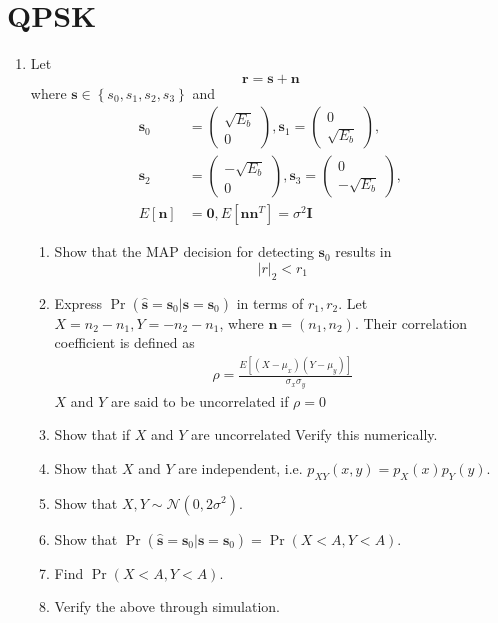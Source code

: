 \documentclass[journal,10pt,twocolumn]{IEEEtran}
\providecommand{\pr}[1]{\ensuremath{\Pr\left(#1\right)}}
\providecommand{\sbrak}[1]{\ensuremath{{}\left[#1\right]}}
\providecommand{\brak}[1]{\ensuremath{\left(#1\right)}}
\providecommand{\cbrak}[1]{\ensuremath{\left\{#1\right\}}}
\providecommand{\abs}[1]{\left\vert#1\right\vert}
\newcommand{\myvec}[1]{\ensuremath{\begin{pmatrix}#1\end{pmatrix}}}
\begin{document}
%
\section{QPSK}
\begin{enumerate}
\item
Let
\begin{equation}
\mathbf{r} = \mathbf{s}+ \mathbf{n}
\end{equation}
where $\mathbf{s} \in \cbrak{s_0,s_1,s_2, s_3}$ and
\begin{align}
\mathbf{s}_0 &= 
\myvec{
\sqrt{E_b}\\
0
},
\mathbf{s}_1 = 
\myvec{
0\\
\sqrt{E_b}
},
\\
\mathbf{s}_2 &= 
\myvec{
-\sqrt{E_b}\\
0
},
\mathbf{s}_3 = 
\myvec{
0\\
-\sqrt{E_b}
},
\\
E\sbrak{\mathbf{n}} &= \mathbf{0}, E\sbrak{\mathbf{n}\mathbf{n}^T} = \sigma^2 \mathbf{I}
\end{align}
%
\begin{enumerate}[label=(\alph{enumii})]
\item Show that the MAP decision for detecting $\mathbf{s}_0$ results in
\begin{equation}
\abs{r}_2 < r_1
\end{equation}
\item Express $\pr{\hat{\mathbf{s}} = \mathbf{s}_0|\mathbf{s} = \mathbf{s}_0}$ in terms of $r_1, r_2$.
Let $X=n_2-n_1, Y = -n_2-n_1$, where $\mathbf{n}=\brak{n_1,n_2}$.
Their correlation coefficient is defined as
%
\begin{align}
\rho = \frac{E\sbrak{\brak{X-\mu_x}\brak{Y-\mu_y}}}{\sigma_x\sigma_y}
\end{align}
%
$X$ and $Y$ are said to be uncorrelated if $\rho = 0$
\item Show that if $X$ and $Y$ are uncorrelated 
Verify this numerically.
\item Show that $X$ and $Y$ are independent, i.e. $p_{XY}(x,y) = p_{X}(x)p_{Y}(y)$.
\item Show that $X,Y \sim \mathcal{N}\brak{0,2\sigma^2}$.
\item Show that $\pr{\hat{\mathbf{s}} = \mathbf{s}_0|\mathbf{s} = \mathbf{s}_0} =\pr{ X < A,  Y < A}$.
\item Find $\pr{ X < A,  Y < A}$.
\item Verify the above through simulation.
\end{enumerate}
\end{enumerate}
\end{document}
